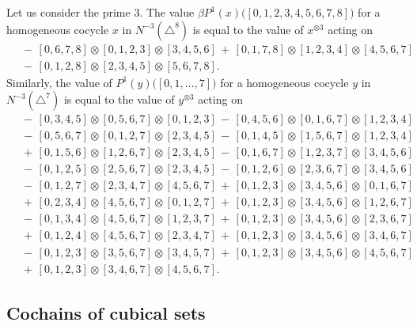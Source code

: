\begin{example}
	Let us consider the prime $3$.
	The value $\beta P^1(x)\big([0,1,2,3,4,5,6,7,8]\big)$ for a homogeneous cocycle $x$ in $N^{-3}(\triangle^8)$ is equal to the value of $x^{\otimes 3}$ acting on
	\begin{align*}
	& \,-\, [0, 6, 7, 8] \otimes [0, 1, 2, 3] \otimes [3, 4, 5, 6] \,+\, [0, 1, 7, 8] \otimes [1, 2, 3, 4] \otimes [4, 5, 6, 7] \\ & \,-\, [0, 1, 2, 8] \otimes [2, 3, 4, 5] \otimes [5, 6, 7, 8].
	\end{align*}
	Similarly, the value of $P^1(y)\big([0,1,\dots,7]\big)$ for a homogeneous cocycle $y$ in $N^{-3}(\triangle^7)$ is equal to the value of $y^{\otimes 3}$ acting on
	\begin{align*}
	& \,-\, [0,3,4,5] \otimes [0,5,6,7] \otimes [0,1,2,3] \,-\, [0,4,5,6] \otimes [0,1,6,7] \otimes [1,2,3,4] \\ & \,-\, [0,5,6,7] \otimes [0,1,2,7] \otimes [2,3,4,5] \,-\, [0,1,4,5] \otimes [1,5,6,7] \otimes [1,2,3,4] \\ & \,+\, [0,1,5,6] \otimes [1,2,6,7] \otimes [2,3,4,5] \,-\, [0,1,6,7] \otimes [1,2,3,7] \otimes [3,4,5,6] \\ & \,-\, [0,1,2,5] \otimes [2,5,6,7] \otimes [2,3,4,5] \,-\, [0,1,2,6] \otimes [2,3,6,7] \otimes [3,4,5,6] \\ & \,-\, [0,1,2,7] \otimes [2,3,4,7] \otimes [4,5,6,7] \,+\, [0,1,2,3] \otimes [3,4,5,6] \otimes [0,1,6,7] \\ & \,+\, [0,2,3,4] \otimes [4,5,6,7] \otimes [0,1,2,7] \,+\, [0,1,2,3] \otimes [3,4,5,6] \otimes [1,2,6,7] \\ & \,-\, [0,1,3,4] \otimes [4,5,6,7] \otimes [1,2,3,7] \,+\, [0,1,2,3] \otimes [3,4,5,6] \otimes [2,3,6,7] \\ & \,+\, [0,1,2,4] \otimes [4,5,6,7] \otimes [2,3,4,7] \,+\, [0,1,2,3] \otimes [3,4,5,6] \otimes [3,4,6,7] \\ & \,-\, [0,1,2,3] \otimes [3,5,6,7] \otimes [3,4,5,7] \,+\, [0,1,2,3] \otimes [3,4,5,6] \otimes [4,5,6,7] \\ & \,+\, [0,1,2,3] \otimes [3,4,6,7] \otimes [4,5,6,7].
	\end{align*}
\end{example}

\subsection{Cochains of cubical sets}

